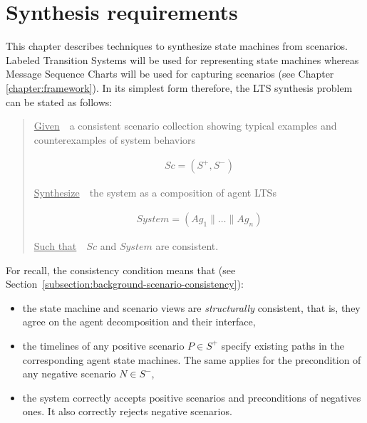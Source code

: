 \section{Synthesis requirements\label{section:inductive-problem-statement}}

This chapter describes techniques to synthesize state machines from scenarios. Labeled Transition Systems will be used for representing state machines whereas Message Sequence Charts will be used for capturing scenarios (see Chapter \ref{chapter:framework}). In its simplest form therefore, the LTS synthesis problem can be stated as follows:

\begin{quotation}
\noindent \underline{Given}~~a consistent scenario collection showing typical examples and counterexamples of system behaviors

\vspace{-0.7cm}
\begin{align*}
Sc = (S^+,S^-)
\end{align*}

\vspace{-0.2cm}
\noindent \underline{Synthesize}~~the system as a composition of agent LTSs

\vspace{-0.7cm}
\begin{align*}
System = (Ag_1 \parallel \ldots \parallel Ag_n)
\end{align*}

\vspace{-0.2cm}
\noindent \underline{Such that}~~$Sc$ and $System$ are consistent.
\end{quotation}

\noindent For recall, the consistency condition means that (see Section~\ref{subsection:background-scenario-consistency}):

\begin{itemize}
\item the state machine and scenario views are \emph{structurally} consistent, that is, they agree on the agent decomposition and their interface,
\item the timelines of any positive scenario $P \in S^+$ specify existing paths in the corresponding agent state machines. The same applies for the precondition of any negative scenario $N \in S^-$,
\item the system correctly accepts positive scenarios and preconditions of negatives ones. It also correctly rejects negative scenarios.
\end{itemize}

